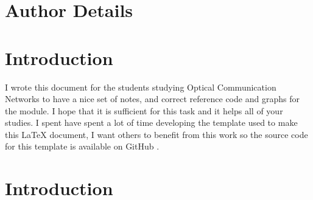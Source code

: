 \documentclass[colorlinks,11pt,a4paper,normalphoto,withhyper,ragged2e]{altareport}
\begin{document}
\MakeReportTitlePage


\setcounter{page}{1}






\section*{Author Details}
\makeauthordetails

\setcounter{tocdepth}{2} 
\tableofcontents %





\section*{Introduction}
I wrote this document for the students studying Optical Communication Networks to have a nice set of notes, and correct reference code and graphs for the module. I hope that it is sufficient for this task and it helps all of your studies. \linebreak
I spent have spent a lot of time developing the template used to make this {\LaTeX} document, I want others to benefit from this work so the source code for this template is available on GitHub \cite{latex_template_github}.
\newpage
{} %




\section{Introduction}
\end{document}
